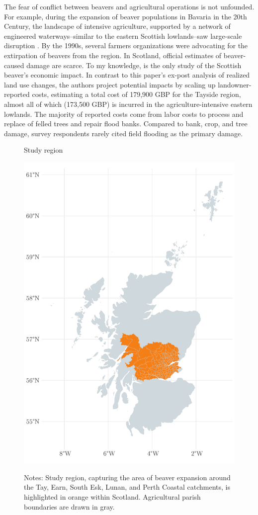 The fear of conflict between beavers and agricultural operations is not unfounded. For example, during the expansion of beaver populations in Bavaria in the 20th Century, the landscape of intensive agriculture, supported by a network of engineered waterways--similar to the eastern Scottish lowlands--saw large-scale disruption \citep{campbell-palmer_managing_2015}. By the 1990s, several farmers organizations were advocating for the extirpation of beavers from the region. In Scotland, official estimates of beaver-caused damage are scarce. To my knowledge, \cite{hamilton_tayside_2015} is the only study of the Scottish beaver's economic impact. In contrast to this paper's ex-post analysis of realized land use changes, the authors project potential impacts by scaling up landowner-reported costs, estimating a total cost of 179,900 GBP for the Tayside region, almost all of which (173,500 GBP) is incurred in the agriculture-intensive eastern lowlands. The majority of reported costs come from labor costs to process and replace of felled trees and repair flood banks. Compared to bank, crop, and tree damage, survey respondents rarely cited field flooding as the primary damage.

\begin{figure}
    \centering
    \caption{Study region}
    \includegraphics[width=0.5\linewidth]{output/figures/study_area.pdf}
    \label{fig:study-area}
    \caption*{\justifying \footnotesize Notes: Study region, capturing the area of beaver expansion around the Tay, Earn, South Esk, Lunan, and Perth Coastal catchments, is highlighted in orange within Scotland. Agricultural parish boundaries are drawn in gray.}
\end{figure}